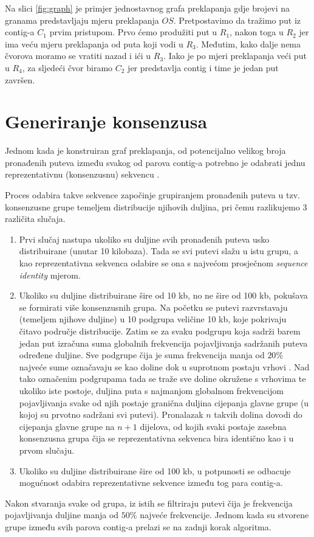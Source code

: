 Na slici \ref{fig:graph} je primjer jednostavnog grafa preklapanja gdje brojevi na granama predstavljaju mjeru preklapanja $OS$. Pretpostavimo da tražimo put iz contig-a $C_1$ prvim pristupom. Prvo ćemo produžiti put u $R_1$, nakon toga u $R_2$ jer ima veću mjeru preklapanja od puta koji vodi u $R_3$. Međutim, kako dalje nema čvorova moramo se vratiti nazad i ići u $R_3$. Iako je po mjeri preklapanja veći put u $R_4$, za sljedeći čvor biramo $C_2$ jer predstavlja contig i time je jedan put završen.

\section{Generiranje konsenzusa}
Jednom kada je konstruiran graf preklapanja, od potencijalno velikog broja pronađenih puteva između svakog od parova contig-a potrebno je odabrati jednu  reprezentativnu (konsenzusnu) sekvencu .

Proces odabira takve sekvence započinje grupiranjem pronađenih puteva u tzv. konsenzusne grupe temeljem distribucije njihovih duljina, pri čemu razlikujemo 3 različita slučaja.

\begin{enumerate}
\item Prvi slučaj nastupa ukoliko su duljine svih pronađenih puteva usko distribuirane (unutar 10 kilobaza). Tada se svi putevi slažu u istu grupu, a kao reprezentativna sekvenca odabire se ona s najvećom prosječnom \textit{sequence identity} mjerom.

\item Ukoliko su duljine distribuirane šire od 10 kb, no ne šire od 100 kb, pokušava se formirati više konsenzusnih grupa. Na početku se putevi razvrstavaju (temeljem njihove duljine) u 10 podgrupa veličine 10 kb, koje pokrivaju čitavo područje distribucije. Zatim se za svaku podgrupu koja sadrži barem jedan put izračuna suma globalnih frekvencija pojavljivanja sadržanih puteva određene duljine. Sve podgrupe čija je suma frekvencija manja od $20\%$ najveće sume označavaju se kao doline  dok u suprotnom postaju vrhovi . Nad tako označenim podgrupama tada se traže sve doline okružene s vrhovima te ukoliko iste postoje, duljina puta s najmanjom globalnom frekvencijom pojavljivanja svake od njih postaje granična duljina cijepanja glavne grupe (u kojoj su prvotno sadržani svi putevi). Pronalazak $n$ takvih dolina dovodi do cijepanja glavne grupe na $n + 1$ dijelova, od kojih svaki postaje zasebna konsenzusna grupa čija se reprezentativna sekvenca bira identično kao i u prvom slučaju.

\item Ukoliko su duljine distribuirane šire od 100 kb, u potpunosti se odbacuje mogućnost odabira reprezentativne sekvence između tog para contig-a.
\end{enumerate}
Nakon stvaranja svake od grupa, iz istih se filtriraju putevi čija je frekvencija pojavljivanja duljine manja od $50\%$ najveće frekvencije. Jednom kada su stvorene grupe između svih parova contig-a prelazi se na zadnji korak algoritma.

